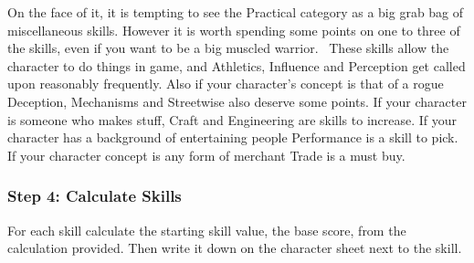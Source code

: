 On the face of it, it is tempting to see the Practical category as a big grab bag of miscellaneous skills. However it is worth spending some points on one to three of the skills, even if you want to be a big muscled warrior.  These skills allow the character to do things in game, and Athletics, Influence and Perception get called upon reasonably frequently. Also if your character’s concept is that of a rogue Deception, Mechanisms and Streetwise also deserve some points. If your character is someone who makes stuff, Craft and Engineering are skills to increase. If your character has a background of entertaining people Performance is a skill to pick. If your character concept is any form of merchant Trade is a must buy.








\subsubsection{Step 4: Calculate Skills}
For each skill calculate the starting skill value, the base score, from the calculation provided. Then write it down on the character sheet next to the skill.  

